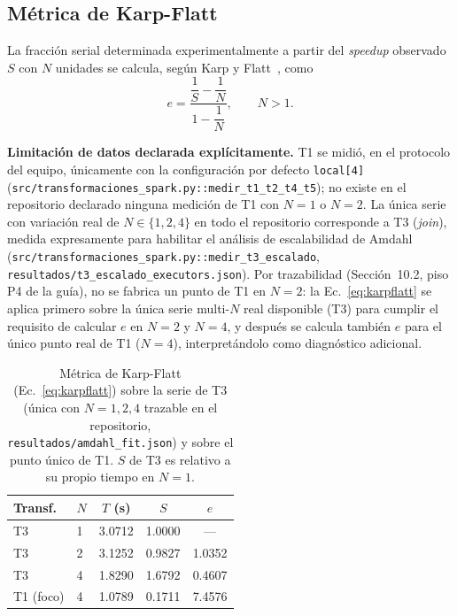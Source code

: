 \documentclass[11pt,a4paper]{article}
\begin{document}
\subsection{M\'etrica de Karp-Flatt}

La fracci\'on serial determinada experimentalmente a partir del \textit{speedup} observado
$S$ con $N$ unidades se calcula, seg\'un Karp y Flatt~\cite{karpflatt1990}, como
\begin{equation}
e = \dfrac{\dfrac{1}{S}-\dfrac{1}{N}}{1-\dfrac{1}{N}}, \qquad N>1.
\label{eq:karpflatt}
\end{equation}

\textbf{Limitaci\'on de datos declarada expl\'icitamente.} T1 se midi\'o, en el protocolo del
equipo, \'unicamente con la configuraci\'on por defecto \texttt{local[4]}
(\texttt{src/\allowbreak{}transformaciones\_spark.\allowbreak{}py:\allowbreak{}:\allowbreak{}medir\_t1\_t2\_t4\_t5}); no existe en el repositorio
declarado ninguna medici\'on de T1 con $N=1$ o $N=2$. La \'unica serie con variaci\'on real de
$N\in\{1,2,4\}$ en todo el repositorio corresponde a T3 (\textit{join}), medida
expresamente para habilitar el an\'alisis de escalabilidad de Amdahl
(\texttt{src/\allowbreak{}transformaciones\_spark.\allowbreak{}py:\allowbreak{}:\allowbreak{}medir\_t3\_escalado},
\texttt{resultados/\allowbreak{}t3\_escalado\_executors.\allowbreak{}json}). Por trazabilidad (Secci\'on~10.2, piso
P4 de la gu\'ia), no se fabrica un punto de T1 en $N=2$: la Ec.~\eqref{eq:karpflatt} se
aplica primero sobre la \'unica serie multi-$N$ real disponible (T3) para cumplir el
requisito de calcular $e$ en $N=2$ y $N=4$, y despu\'es se calcula tambi\'en $e$ para el
\'unico punto real de T1 ($N=4$), interpret\'andolo como diagn\'ostico adicional.

\begin{table}[h]
\centering
\caption{M\'etrica de Karp-Flatt (Ec.~\eqref{eq:karpflatt}) sobre la serie de T3
(\'unica con $N=1,2,4$ trazable en el repositorio, \texttt{resultados/\allowbreak{}amdahl\_fit.\allowbreak{}json}) y
sobre el punto \'unico de T1. $S$ de T3 es relativo a su propio tiempo en $N=1$.}
\label{tab:karpflatt}
\begin{tabular}{@{}llS[table-format=1.4]S[table-format=1.4]S[table-format=1.4]@{}}
\toprule
\textbf{Transf.} & \textbf{$N$} & {$T$ (s)} & {$S$} & {$e$} \\
\midrule
T3 & 1 & 3.0712 & 1.0000 & {---} \\
T3 & 2 & 3.1252 & 0.9827 & 1.0352 \\
T3 & 4 & 1.8290 & 1.6792 & 0.4607 \\
\midrule
T1 (foco) & 4 & 1.0789 & 0.1711 & 7.4576 \\
\bottomrule
\end{tabular}
\end{table}
\end{document}
